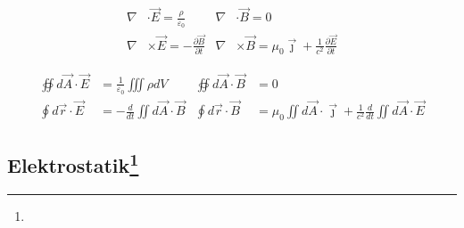 \documentclass[12pt,a4paper]{article}
\renewcommand{\d}[2]{\frac{d #1}{d #2}}
\newcommand{\pd}[2]{\frac{\partial #1}{\partial #2}}
\renewcommand{\=}[1]{\stackrel{#1}{=}}
\newcommand{\js}{\vec \jmath}
\newcommand{\eps}{\varepsilon}
\theoremstyle{definition}
\theoremstyle{remark}
\begin{document}
\begin{framed}
\begin{align*}
\nabla & \cdot \vec E = \frac{\rho}{\varepsilon_0} & \nabla & \cdot \vec B = 0\\
\nabla &\times \vec E = - \pd{\vec{B}}{t} & \nabla & \times \vec B =  \mu_0 \vec \jmath + \frac{1}{c^2} \pd{\vec{E}}{t}
\end{align*}
\end{framed}

\begin{framed}
\begin{align*}
\oiint d\vec A \cdot \vec E &= \frac{1}{\eps_0}\iiint \rho dV & \oiint d\vec A \cdot \vec B &= 0\\
\oint d\vec r \cdot \vec E &= - \d{}{t} \iint d\vec A \cdot \vec{B} & \oint d\vec r \cdot \vec B &= \mu_0 \iint d\vec A \cdot \js + \frac{1}{c^2} \d{}{t} \iint d\vec A \cdot \vec{E}
\end{align*}
\end{framed}

\subsection[Elektrostatik]{Elektrostatik\let\thefootnote\relax\footnote{}}
\end{document}
